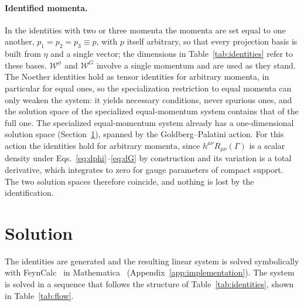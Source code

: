 \documentclass[prd,aps,preprint,superscriptaddress,nofootinbib,amsmath,amssymb,eqsecnum]{revtex4-2}
\newcommand{\W}{\mathcal{W}}
\providecommand{\DIFaddtex}[1]{{\protect\color{blue} \sf #1}} %
\providecommand{\DIFdeltex}[1]{{\protect\color{red} \scriptsize #1}} %
\providecommand{\DIFaddbegin}{} %
\providecommand{\DIFaddend}{} %
\providecommand{\DIFdelbegin}{} %
\providecommand{\DIFdelend}{} %
\providecommand{\DIFadd}[1]{\texorpdfstring{\DIFaddtex{#1}}{#1}} %
\providecommand{\DIFdel}[1]{\texorpdfstring{\DIFdeltex{#1}}{}} %
\begin{document}
\paragraph{Identified momenta.} In the identities with two or three momenta the momenta are
set equal to one another, $p_1=p_2=p_3\equiv p$, with $p$ itself arbitrary, so that every
projection basis is built from $\eta$ and a single vector; the dimensions in
Table~\ref{tab:identities} refer to these bases. $\W^{\phi}$ and $\W^{G}$ involve a single
momentum and are used as they stand. The Noether identities hold as tensor identities for
arbitrary momenta, in particular for equal ones, so the \DIFdelbegin \DIFdel{specialization }\DIFdelend \DIFaddbegin \DIFadd{restriction to equal momenta }\DIFaddend can only weaken the
system: it yields necessary conditions, never spurious ones, and the solution space of the
\DIFdelbegin \DIFdel{specialized }\DIFdelend \DIFaddbegin \DIFadd{equal-momentum }\DIFaddend system contains that of the full one. The \DIFdelbegin \DIFdel{specialized }\DIFdelend \DIFaddbegin \DIFadd{equal-momentum }\DIFaddend system already has a
one-dimensional solution space (Section~\ref{sec:solution}), spanned by the
Goldberg--Palatini action. For this action the identities hold for arbitrary momenta, since
$h^{\mu\nu}R_{\mu\nu}(\Gamma)$ is a scalar density under
Eqs.~\eqref{eq:dphi}--\eqref{eq:dG} by construction and its variation is a total derivative,
which integrates to zero for gauge parameters of compact support. The two solution spaces
therefore coincide, and nothing is lost by the identification.

\section{Solution}
\label{sec:solution}

The identities are generated and the resulting linear system is solved symbolically with
FeynCalc~\cite{FeynCalc} in Mathematica~\cite{Mathematica} (Appendix~\ref{app:implementation}).
The system is solved in a sequence that follows the structure of
Table~\ref{tab:identities}, shown in Table~\ref{tab:flow}.
\end{document}
